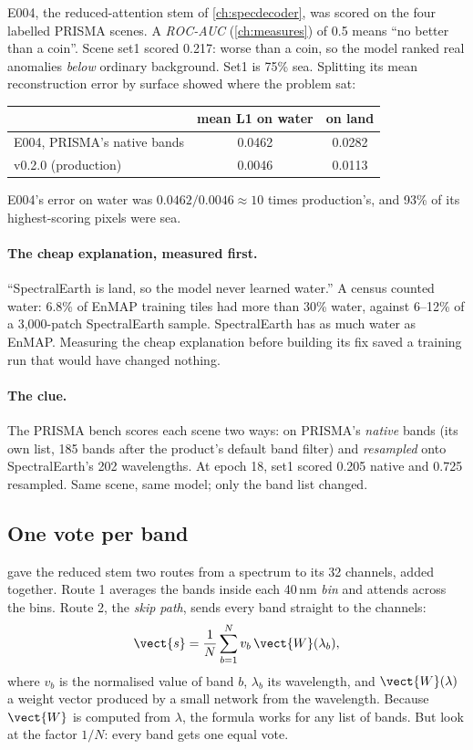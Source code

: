 E004, the reduced-attention stem of \cref{ch:specdecoder}, was scored on the four labelled PRISMA scenes. A
\emph{ROC-AUC} (\cref{ch:measures}) of 0.5 means ``no better than a coin''. Scene set1 scored 0.217: worse than a coin,
so the model ranked real anomalies \emph{below} ordinary background.\tbrk{}
Set1 is 75\% sea. Splitting its mean reconstruction error by surface showed where the problem sat:
\begin{center}
\begin{tabular}{lcc}
\toprule
& mean L1 on water & on land\\
\midrule
E004, PRISMA's native bands & 0.0462 & 0.0282\\
v0.2.0 (production) & 0.0046 & 0.0113\\
\bottomrule
\end{tabular}
\end{center}
E004's error on water was $0.0462 / 0.0046 \approx 10$ times production's, and 93\% of its highest-scoring pixels were
sea.

\paragraph{The cheap explanation, measured first.} ``SpectralEarth is land, so the model never learned water.'' A census
counted water: 6.8\% of EnMAP training tiles had more than 30\% water, against 6--12\% of a 3,000-patch SpectralEarth
sample.\tbrk{} SpectralEarth has as much water as
EnMAP. Measuring the cheap explanation before building its fix saved a training run that would have changed nothing.

\paragraph{The clue.} The PRISMA bench scores each scene two ways: on PRISMA's \emph{native} bands (its own list, 185
bands after the product's default band filter) and \emph{resampled} onto SpectralEarth's 202 wavelengths. At epoch 18,
set1 scored 0.205 native and 0.725 resampled. Same scene, same model; only the band list changed.

\subsection{One vote per band}

 gave the reduced stem two routes from a spectrum to its 32 channels, added together. Route 1
averages the bands inside each 40\,nm \emph{bin} and attends across the bins. Route 2, the \emph{skip path}, sends every
band straight to the channels:
\begin{equation}\label{eq:pretrain:skip}
  \vect{s} = \frac{1}{N}\sum_{b=1}^{N} v_b\,\vect{W}(\lambda_b),
\end{equation}
where $v_b$ is the normalised value of band $b$, $\lambda_b$ its wavelength, and $\vect{W}(\lambda)$ a weight vector
produced by a small network from the wavelength. Because $\vect{W}$ is computed from $\lambda$, the formula works for any
list of bands. But look at the factor $1/N$: every band gets one equal vote.

